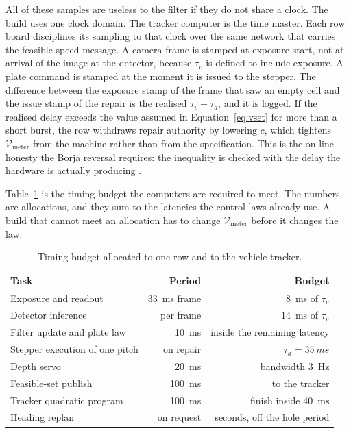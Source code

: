 All of these samples are useless to the filter if they do not share a clock. The build uses one clock domain. The tracker computer is the time master. Each row board disciplines its sampling to that clock over the same network that carries the feasible-speed message. A camera frame is stamped at exposure start, not at arrival of the image at the detector, because \(\tau_v\) is defined to include exposure. A plate command is stamped at the moment it is issued to the stepper. The difference between the exposure stamp of the frame that saw an empty cell and the issue stamp of the repair is the realised \(\tau_v+\tau_a\), and it is logged. If the realised delay exceeds the value assumed in Equation~\eqref{eq:vset} for more than a short burst, the row withdraws repair authority by lowering \(c\), which tightens \(\mathcal{V}_{\mathrm{meter}}\) from the machine rather than from the specification. This is the on-line honesty the Borja reversal requires: the inequality is checked with the delay the hardware is actually producing \cite{borja2018,borja2021}.

Table~\ref{tab:budget} is the timing budget the computers are required to meet. The numbers are allocations, and they sum to the latencies the control laws already use. A build that cannot meet an allocation has to change \(\mathcal{V}_{\mathrm{meter}}\) before it changes the law.

\begin{table}[ht]
\centering
\caption{Timing budget allocated to one row and to the vehicle tracker.}
\label{tab:budget}
\begin{tabular}{@{}lrr@{}}
\toprule
Task & Period & Budget \\
\midrule
Exposure and readout & \SI{33}{ms} frame & \SI{8}{ms} of \(\tau_v\) \\
Detector inference & per frame & \SI{14}{ms} of \(\tau_v\) \\
Filter update and plate law & \SI{10}{ms} & inside the remaining latency \\
Stepper execution of one pitch & on repair & \(\tau_a=\SI{35}{ms}\) \\
Depth servo & \SI{20}{ms} & bandwidth \SI{3}{Hz} \\
Feasible-set publish & \SI{100}{ms} & to the tracker \\
Tracker quadratic program & \SI{100}{ms} & finish inside \SI{40}{ms} \\
Heading replan & on request & seconds, off the hole period \\
\bottomrule
\end{tabular}
\end{table}

